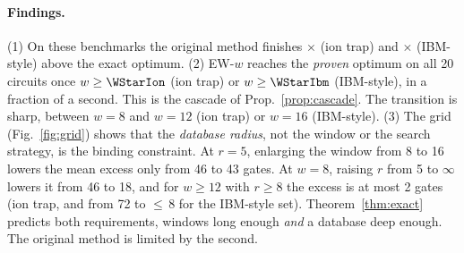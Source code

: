 \paragraph{Findings.} (1) On these benchmarks the original method finishes \GapFactorIon$\times$ (ion trap) and
\GapFactorIbm$\times$ (IBM-style) above the exact optimum. (2) EW-$w$ reaches the
\emph{proven} optimum on all 20 circuits once $w\ge\WStarIon$ (ion trap) or $w\ge\WStarIbm$ (IBM-style), in a fraction of a second.
This is the cascade of Prop.~\ref{prop:cascade}. The transition is sharp, between $w=8$ and $w=12$ (ion trap) or $w=16$ (IBM-style). (3) The grid (Fig.~\ref{fig:grid})
shows that the \emph{database radius}, not the window or the search strategy, is the binding constraint. At $r=5$, enlarging the
window from 8 to 16 lowers the mean excess only from 46 to 43 gates. At $w=8$, raising $r$ from 5 to $\infty$ lowers it from 46 to 18,
and for $w\ge12$ with $r\ge8$ the excess is at most 2 gates (ion trap, and from 72 to $\le$\,8 for the IBM-style set). Theorem~\ref{thm:exact} predicts
both requirements, windows long enough \emph{and} a database deep enough. The original method is limited by the second.
